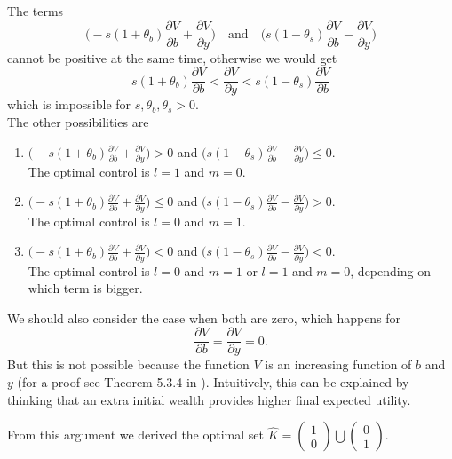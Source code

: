 \vspace{3em}
\noindent
The terms 
$$ \biggl( -s(1+\theta_b)\frac{\partial V}{\partial b} + \frac{\partial V}{\partial y} \biggr) 
\quad \mbox{and} \quad \biggl( s(1-\theta_s)\frac{\partial V}{\partial b} - \frac{\partial V}{\partial y} \biggr)  $$
cannot be positive at the same time, otherwise we would get
$$ s(1+\theta_b)\frac{\partial V}{\partial b} < \frac{\partial V}{\partial y} < s(1-\theta_s)\frac{\partial V}{\partial b} $$
which is impossible for $s,\theta_b,\theta_s>0$. \\

\noindent
The other possibilities are 
\begin{enumerate}
 \item $\biggl(-s(1+\theta_b)\frac{\partial V}{\partial b} + \frac{\partial V}{\partial y}\biggr) > 0$ 
 and $\biggl(s(1-\theta_s)\frac{\partial V}{\partial b} - \frac{\partial V}{\partial y}\biggr) \leq 0$. \\ The optimal control is $l=1$ and $m=0$.
 \item $\biggl(-s(1+\theta_b)\frac{\partial V}{\partial b} + \frac{\partial V}{\partial y}\biggr) \leq 0$
 and $\biggl(s(1-\theta_s)\frac{\partial V}{\partial b} - \frac{\partial V}{\partial y}\biggr) > 0$. \\ The optimal control is $l=0$ and $m=1$.
 \item $\biggl(-s(1+\theta_b)\frac{\partial V}{\partial b} + \frac{\partial V}{\partial y}\biggr) < 0$ and 
 $\biggl(s(1-\theta_s)\frac{\partial V}{\partial b} - \frac{\partial V}{\partial y}\biggr) < 0$. \\ The optimal control is $l=0$ and $m=1$ or $l=1$ and $m=0$, depending on which term 
 is bigger.
\end{enumerate}

\noindent
We should also consider the case when both are zero, which happens for 
$$\frac{\partial V}{\partial b} = \frac{\partial V}{\partial y} = 0.$$ 
But this is not possible because the function $V$ is an increasing function of $b$ and $y$ 
(for a proof see Theorem 5.3.4 in \cite{Damgaard}).
Intuitively, this can be explained by thinking that an extra initial wealth provides higher final expected utility.

\noindent
From this argument we derived the optimal set $\hat K = \left( \begin{array}{c}
			   1 \\
			   0
                          \end{array} \right) \bigcup \left( \begin{array}{c}
			   0 \\
			   1
                          \end{array} \right)$.

